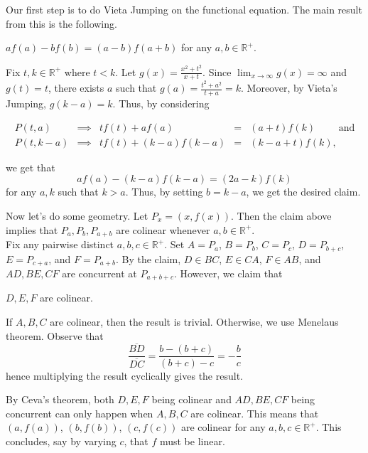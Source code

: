 \begin{solution}
    Our first step is to do Vieta Jumping on the functional equation. The main
    result from this is the following. 

    \begin{claim}
        $af(a) - bf(b) = (a-b)f(a+b)$ for any $a,b\in\mathbb{R}^+$.
    \end{claim}

    \begin{prooof}
        Fix $t,k\in\mathbb{R}^+$ where $t<k$. Let $g(x)=\tfrac{x^2+t^2}{x+t}$.
        Since $\lim_{x\to\infty}g(x)=\infty$ and $g(t)=t$, there exists $a$
        such that $g(a) = \tfrac{t^2+a^2}{t+a}=k$. Moreover, by Vieta's
        Jumping, $g(k-a)=k$. Thus, by considering

        \[\begin{array}{rcrcl} 
            P(t,a) & \implies & tf(t) + af(a)&=&(a+t)f(k)\qquad\text{ and}
            \\[4pt] P(t,k-a) & \implies & tf(t) + (k-a)f(k-a)&=&(k-a+t)f(k), 
        \end{array}\]

        we get that
        \[af(a) - (k-a)f(k-a) = (2a-k)f(k)\]
        for any $a,k$ such that $k>a$. Thus, by setting $b=k-a$, we get the
        desired claim. 
    \end{prooof}

    Now let's do some geometry. Let $P_x = (x,f(x))$. Then the claim above
    implies that $P_a, P_b, P_{a+b}$ are colinear whenever
    $a,b\in\mathbb{R}^+$.\\

    Fix any pairwise distinct $a,b,c\in\mathbb{R}^+$. Set $A=P_a$, $B=P_b$,
    $C=P_c$, $D=P_{b+c}$, $E=P_{c+a}$, and $F=P_{a+b}$. By the claim, $D\in
    BC$, $E\in CA$, $F\in AB$, and $AD,BE,CF$ are concurrent at $P_{a+b+c}$.
    However, we claim that 

    \begin{claim}
        $D,E,F$ are colinear.
    \end{claim}

    \begin{prooof}
        If $A,B,C$ are colinear, then the result is trivial. Otherwise, we use
        Menelaus theorem. Observe that
        $$\frac{\overline{BD}}{\overline{DC}} = \frac{b - (b+c)}{(b+c)-c} =
        -\frac bc$$hence multiplying the result cyclically gives the result. 
    \end{prooof}

    By Ceva's theorem, both $D,E,F$ being colinear and $AD,BE,CF$ being
    concurrent can only happen when $A,B,C$ are colinear. This means that
    $(a,f(a))$, $(b,f(b))$, $(c,f(c))$ are colinear for any
    $a,b,c\in\mathbb{R}^+$. This concludes, say by varying $c$, that $f$ must
    be linear.
\end{solution}
